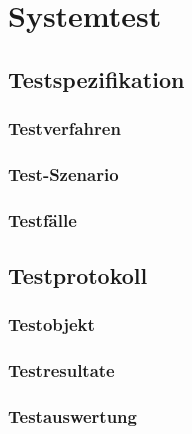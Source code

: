 \section{Systemtest}
\subsection{Testspezifikation}
\subsubsection{Testverfahren}
\subsubsection{Test-Szenario}
\subsubsection{Testfälle}
\subsection{Testprotokoll}
\subsubsection{Testobjekt}
\subsubsection{Testresultate}
\subsubsection{Testauswertung}
